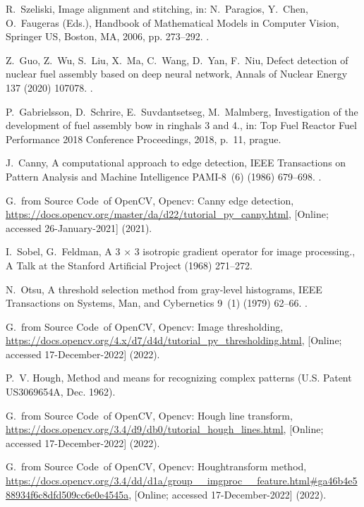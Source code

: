 \documentclass[preprint,12pt]{elsarticle}
\begin{document}
\begin{thebibliography}{10}
R.~Szeliski, Image alignment and stitching, in: N.~Paragios, Y.~Chen,
  O.~Faugeras (Eds.), Handbook of Mathematical Models in Computer Vision,
  Springer US, Boston, MA, 2006, pp. 273--292.
\newblock \href {https://doi.org/10.1007/0-387-28831-7\_17}
  {}.

Z.~Guo, Z.~Wu, S.~Liu, X.~Ma, C.~Wang, D.~Yan, F.~Niu, Defect detection of
  nuclear fuel assembly based on deep neural network, Annals of Nuclear Energy
  137 (2020) 107078.
\newblock \href {https://doi.org/10.1016/j.anucene.2019.107078}
  {}.

P.~Gabrielsson, D.~Schrire, E.~Suvdantsetseg, M.~Malmberg, Investigation of the
  development of fuel assembly bow in ringhals 3 and 4., in: Top Fuel Reactor
  Fuel Performance 2018 Conference Proceedings, 2018, p.~11, prague.

J.~{Canny}, A computational approach to edge detection, IEEE Transactions on
  Pattern Analysis and Machine Intelligence PAMI-8~(6) (1986) 679--698.
\newblock \href {https://doi.org/10.1109/TPAMI.1986.4767851}
  {}.

G.~from Source Code~of OpenCV, Opencv: Canny edge detection,
  \url{https://docs.opencv.org/master/da/d22/tutorial\_py\_canny.html},
  [Online; accessed 26-January-2021] (2021).

I.~Sobel, G.~Feldman, A 3 × 3 isotropic gradient operator for image
  processing., A Talk at the Stanford Artificial Project (1968) 271--272.

N.~{Otsu}, A threshold selection method from gray-level histograms, IEEE
  Transactions on Systems, Man, and Cybernetics 9~(1) (1979) 62--66.
\newblock \href {https://doi.org/10.1109/TSMC.1979.4310076}
  {}.

G.~from Source Code~of OpenCV, Opencv: Image thresholding,
  \url{https://docs.opencv.org/4.x/d7/d4d/tutorial\_py\_thresholding.html},
  [Online; accessed 17-December-2022] (2022).

P.~V. Hough, Method and means for recognizing complex patterns (U.S. Patent
  US3069654A, Dec. 1962).

G.~from Source Code~of OpenCV, Opencv: Hough line transform,
  \url{https://docs.opencv.org/3.4/d9/db0/tutorial\_hough\_lines.html},
  [Online; accessed 17-December-2022] (2022).

G.~from Source Code~of OpenCV, Opencv: Houghtransform method,
  \url{https://docs.opencv.org/3.4/dd/d1a/group\_\_imgproc\_\_feature.html\#ga46b4e588934f6c8dfd509cc6e0e4545a},
  [Online; accessed 17-December-2022] (2022).

\end{thebibliography}





\end{document}
